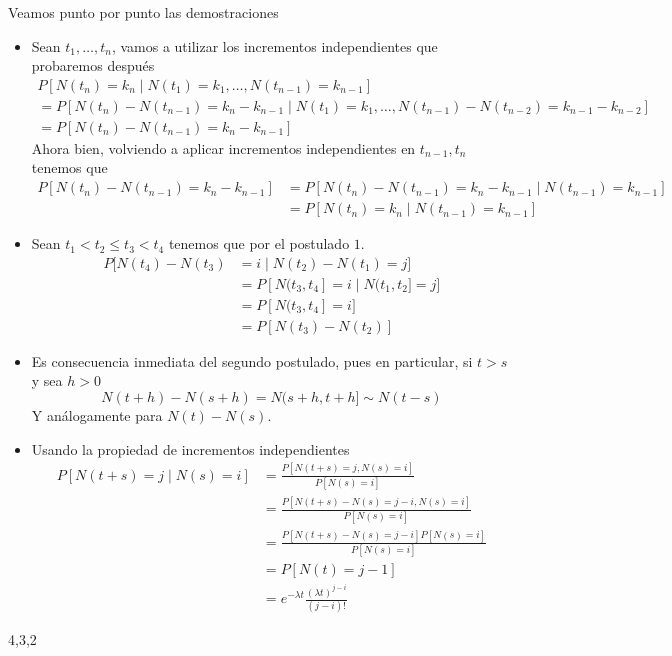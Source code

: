\documentclass[twoside]{article}
\begin{document}
\begin{solucion}
Veamos punto por punto las demostraciones
\begin{itemize}
\item Sean $t_1,\dotsc,t_n$, vamos a utilizar los incrementos independientes que probaremos después
\begin{gather*}
P[N(t_n) =  k_n \mid N(t_1)=k_1,\dotsc,N(t_{n-1})=k_{n-1}] \\= P[N(t_n) -N(t_{n-1}) =  k_n - k_{n-1}\mid N(t_1)=k_1,\dotsc,N(t_{n-1})-N(t_{n-2})=k_{n-1}-k_{n-2}]\\
=P[N(t_n)-N(t_{n-1})=k_n - k_{n-1}]
\end{gather*}
Ahora bien, volviendo a aplicar incrementos independientes en $t_{n-1},t_n$ tenemos que 
\begin{align*}
P[N(t_n)-N(t_{n-1})=k_n - k_{n-1}] &= P[N(t_n)-N(t_{n-1})=k_n - k_{n-1}\mid N(t_{n-1}) = k_{n-1}]\\
&= P[N(t_n)=k_n \mid N(t_{n-1})=k_{n-1}]
\end{align*}
\item Sean $t_1<t_2\leq t_3<t_4$ tenemos que por el postulado $1$.
\begin{align*}
P[N(t_4)-N(t_3)& = i\mid N(t_2)-N(t_1)=j]\\
& = P[N(t_3,t_4]=i \mid N(t_1,t_2]=j] \\
&= P[N(t_3,t_4]=i] \\
&= P[N(t_3)-N(t_2)]
\end{align*}
\item Es consecuencia inmediata del segundo postulado, pues en particular, si $t>s$ y sea $h>0$
$$N(t+h)-N(s+h)=N(s+h,t+h] \sim N(t-s) $$
Y análogamente para $N(t)-N(s)$. 
\item Usando la propiedad de incrementos independientes
\begin{align*}
P[N(t+s)=j\mid N(s)=i] &= \frac{P[N(t+s)=j,  N(s)=i]}{P[N(s)=i]}\\
&=\frac{P[N(t+s)-N(s)=j-i,  N(s)=i]}{P[N(s)=i]}\\
&=\frac{P[N(t+s)-N(s)=j-i]P[N(s)=i]}{P[N(s)=i]}\\
&=P[N(t)=j-1]\\
&=e^{-\lambda t}\frac{(\lambda t)^{j-i}}{(j-i)!}
\end{align*}
\end{itemize}
\end{solucion}

4,3,2
\end{document}
